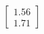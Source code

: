 \documentclass[preview]{standalone}
\begin{document}
\begin{align*}
\begin{bmatrix} 1.56 \\ 1.71 \end{bmatrix}
\end{align*}
\end{document}
